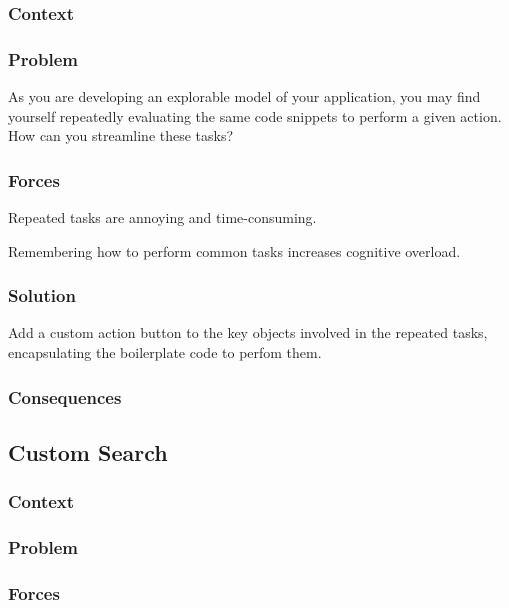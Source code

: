 \documentclass[sigconf]{acmart}
\begin{document}
\subsubsection*{Context}
\subsubsection*{Problem}

As you are developing an explorable model of your application, you may find yourself repeatedly evaluating the same code snippets to perform a given action. How can you streamline these tasks?

\subsubsection*{Forces}

Repeated tasks are annoying and time-consuming.

Remembering how to perform common tasks increases cognitive overload.

\subsubsection*{Solution}

Add a custom action button to the key objects involved in the repeated tasks, encapsulating the boilerplate code to perfom them.


\subsubsection*{Consequences}

\subsection*{Custom Search}\label{pat:customSearch}
\subsubsection*{Context}
\subsubsection*{Problem}
\subsubsection*{Forces}
\end{document}
